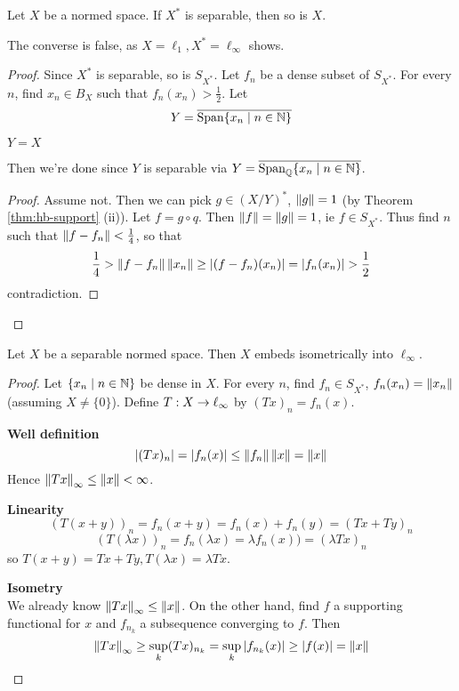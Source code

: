 \documentclass{article}
\begin{document}
\begin{nthm}
  Let $X$ be a normed space. If $X^*$ is separable, then so is $X$.
\end{nthm}
\begin{rmk}
  The converse is false, as $X = \ell_1, X^* = \ell_\infty$ shows.
\end{rmk}
\begin{proof}
  Since $X^*$ is separable, so is $S_{X^*}$. Let $f_n$ be a dense subset of $S_{X^*}$. For every $n$, find $x_n \in B_X$ such that $f_n(x_n) > \frac 12$. Let
  $$Y = \overline{\operatorname{Span}\{x_n \mid n \in \mathbb N\}}$$
  \begin{claim}
    $Y = X$
  \end{claim}
  Then we're done since $Y$ is separable via $Y = \overline{\operatorname{Span}_\mathbb Q\{x_n \mid n \in \mathbb N\}}$.
  \begin{proof}
    Assume not. Then we can pick $g \in (X/Y)^*$, $\left\lVert g\right\rVert = 1$ (by Theorem \ref{thm:hb-support} (ii)). Let $f = g \circ q$. Then $\left\lVert f\right\rVert = \left\lVert g\right\rVert = 1$, ie $f \in S_{X^*}$. Thus find $n$ such that $\left\lVert f - f_n\right\rVert < \frac 14$, so that
    $$\frac 14 > \left\lVert f - f_n\right\rVert\left\lVert x_n\right\rVert \ge \left\lvert (f - f_n)(x_n)\right\rvert = \left\lvert f_n(x_n)\right\rvert > \frac 12$$
    contradiction.
  \end{proof}
\end{proof}

\begin{nthm}
  Let $X$ be a separable normed space. Then $X$ embeds isometrically into $\ell_\infty$.
\end{nthm}
\begin{proof}
  Let $\{x_n \mid n \in \mathbb N\}$ be dense in $X$. For every $n$, find $f_n \in S_{X^*}$, $f_n(x_n) = \left\lVert x_n\right\rVert$ (assuming $X \ne \{0\}$). Define $T : X \rightarrow \ell_\infty$ by $(Tx)_n = f_n(x)$.

  {\bf Well definition}
  $$ \left\lvert (Tx)_n\right\rvert = \left\lvert f_n(x)\right\rvert \le \left\lVert f_n\right\rVert\left\lVert x\right\rVert = \left\lVert x\right\rVert$$
  Hence $\left\lVert Tx\right\rVert_\infty \le \left\lVert x\right\rVert < \infty$.

  {\bf Linearity}
  $$ (T(x + y))_n = f_n(x + y) = f_n(x) + f_n(y) = (Tx + Ty)_n$$
  $$ (T(\lambda x))_n = f_n(\lambda x) = \lambda f_n(x)) = (\lambda Tx)_n$$
  so $T(x + y) = Tx + Ty, T(\lambda x) = \lambda Tx$.

  {\bf Isometry} \\
  We already know $\left\lVert Tx\right\rVert_\infty \le \left\lVert x\right\rVert$. On the other hand, find $f$ a supporting functional for $x$ and $f_{n_k}$ a subsequence converging to $f$. Then
  $$\left\lVert Tx\right\rVert_\infty \ge \sup_k (Tx)_{n_k} = \sup_k \left\lvert f_{n_k}(x)\right\rvert \ge \left\lvert f(x)\right\rvert = \left\lVert x\right\rVert$$
\end{proof}
\end{document}
